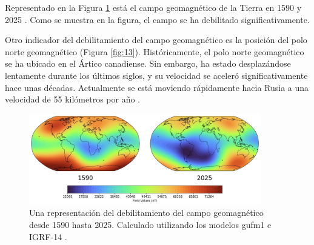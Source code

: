\documentclass[10pt,twocolumn,letterpaper]{article}
\begin{document}
Representado en la Figura \ref{fig:14} está el campo geomagnético de la Tierra en 1590 y 2025 \cite{125,126}. Como se muestra en la figura, el campo se ha debilitado significativamente.

Otro indicador del debilitamiento del campo geomagnético es la posición del polo norte geomagnético (Figura \ref{fig:13}). Históricamente, el polo norte geomagnético se ha ubicado en el Ártico canadiense. Sin embargo, ha estado desplazándose lentamente durante los últimos siglos, y su velocidad se aceleró significativamente hace unas décadas. Actualmente se está moviendo rápidamente hacia Rusia a una velocidad de 55 kilómetros por año \cite{124}.

\begin{figure}[t]
\begin{center}
\includegraphics[width=0.9\textwidth]{saa.jpg}
\end{center}
   \caption{Una representación del debilitamiento del campo geomagnético desde 1590 hasta 2025. Calculado utilizando los modelos gufm1 e IGRF-14 \cite{125,126}.}
\label{fig:14}
\end{figure}
\end{document}
